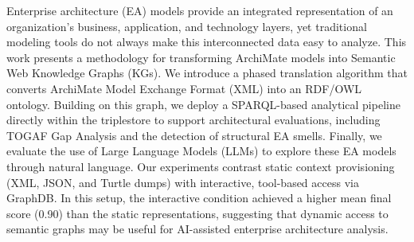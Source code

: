 Enterprise architecture (EA) models provide an integrated representation of an organization's business, application, and technology layers, yet traditional modeling tools do not always make this interconnected data easy to analyze. This work presents a methodology for transforming ArchiMate models into Semantic Web Knowledge Graphs (KGs). We introduce a phased translation algorithm that converts ArchiMate Model Exchange Format (XML) into an RDF/OWL ontology. Building on this graph, we deploy a SPARQL-based analytical pipeline directly within the triplestore to support architectural evaluations, including TOGAF Gap Analysis and the detection of structural EA smells. Finally, we evaluate the use of Large Language Models (LLMs) to explore these EA models through natural language. Our experiments contrast static context provisioning (XML, JSON, and Turtle dumps) with interactive, tool-based access via GraphDB. In this setup, the interactive condition achieved a higher mean final score (0.90) than the static representations, suggesting that dynamic access to semantic graphs may be useful for AI-assisted enterprise architecture analysis.
